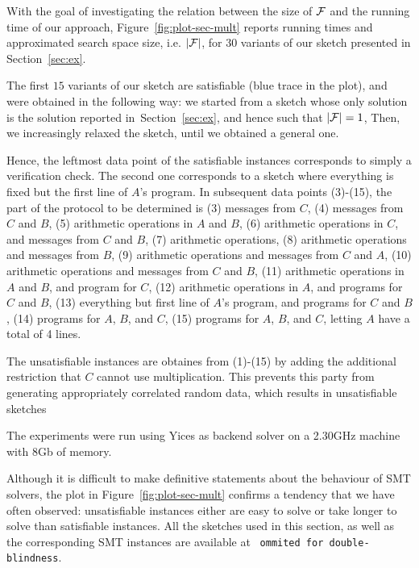 \documentclass[preprint]{sig-alternate-05-2015}
\begin{document}
With the goal of investigating the 
relation between the size of ${\cal F}$
and the running time of our approach, 
Figure~\ref{fig:plot-sec-mult} reports 
running times and approximated
search space size, i.e. $|{\cal F}|$,
for $30$ variants of our sketch presented in 
Section~\ref{sec:ex}.

The first $15$ variants of our sketch are satisfiable 
(blue trace in the plot),
and were obtained in the following way:
we started from a sketch whose only solution 
is the solution reported in~Section~\ref{sec:ex},
and hence such that $|{\cal F}| = 1$,
Then, we increasingly relaxed the sketch,
until we obtained a general one.

Hence, the leftmost data point of the satisfiable instances corresponds to 
simply a verification check.
The second one corresponds to a sketch 
where everything is fixed but
the first line of $A$'s program.
In subsequent data points (3)-(15), the part of the protocol to be determined
is (3) messages from $C$,
(4) messages from $C$ and $B$,
(5) arithmetic operations in $A$ and $B$,
(6) arithmetic operations in $C$, and messages from $C$ and $B$,
(7) arithmetic operations,
(8) arithmetic operations and messages from $B$,
(9) arithmetic operations and messages from $C$ and $A$,
(10) arithmetic operations and messages from $C$ and $B$,
(11) arithmetic operations in $A$ and $B$, and program for $C$,
(12) arithmetic operations in $A$, and programs for $C$ and $B$,
(13) everything but first line of $A$'s program, and programs for $C$ and $B$,
(14) programs for $A$, $B$, and $C$,
(15) programs for $A$, $B$, and $C$, letting $A$ have a total of 4 lines.

The unsatisfiable instances are obtaines from (1)-(15) by adding the additional
restriction that $C$ cannot use multiplication. This prevents this
party from generating appropriately correlated random data,
which results in unsatisfiable sketches

The experiments were run using Yices as backend solver
on a 2.30GHz machine with 8Gb of memory.

Although it is difficult to make definitive statements 
about the behaviour of SMT solvers, the plot in
Figure~\ref{fig:plot-sec-mult}
confirms a tendency that we have often observed:
unsatisfiable instances 
either are easy to solve or
take longer to solve than satisfiable instances.
All the sketches used in this section, as well as the 
corresponding SMT instances are available at
~\texttt{ommited for double-blindness}.
\end{document}
